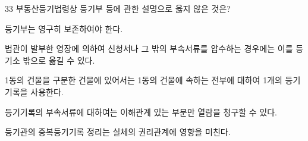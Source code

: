 \begin{question}{33}
부동산등기법령상 등기부 등에 관한 설명으로 옳지 않은 것은?
\begin{choices}
  \item 등기부는 영구히 보존하여야 한다.
  \item 법관이 발부한 영장에 의하여 신청서나 그 밖의 부속서류를 압수하는 경우에는 이를 등기소 밖으로 옮길 수 있다.
  \item 1동의 건물을 구분한 건물에 있어서는 1동의 건물에 속하는 전부에 대하여 1개의 등기기록을 사용한다.
  \item 등기기록의 부속서류에 대하여는 이해관계 있는 부분만 열람을 청구할 수 있다.
  \item 등기관의 중복등기기록 정리는 실체의 권리관계에 영향을 미친다.
\end{choices}
\end{question}
